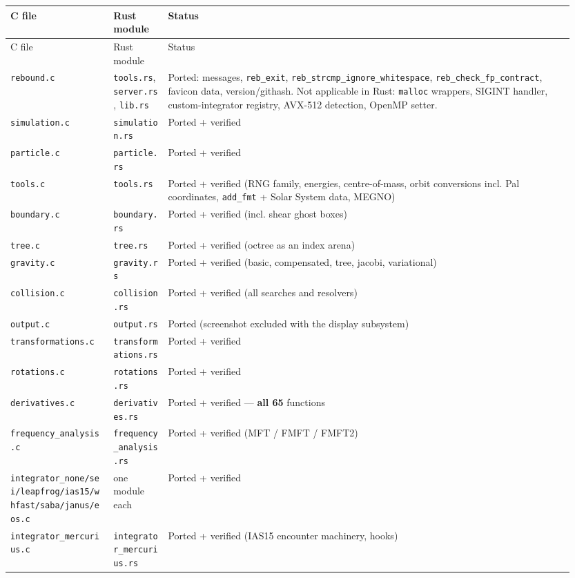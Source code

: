 \documentclass[11pt]{article}
\begin{document}
\begin{longtable}{L{0.171\linewidth}L{0.099\linewidth}L{0.679\linewidth}}
\toprule
C file & Rust module & Status \\
\midrule
\endfirsthead
\toprule
C file & Rust module & Status \\
\midrule
\endhead
\texttt{rebound.c} & \texttt{tools.rs}, \texttt{server.rs}, \texttt{lib.rs} & Ported: messages, \texttt{reb\_exit}, \texttt{reb\_strcmp\_ignore\_whitespace}, \texttt{reb\_check\_fp\_contract}, favicon data, version/githash. Not applicable in Rust: \texttt{malloc} wrappers, SIGINT handler, custom-integrator registry, AVX-512 detection, OpenMP setter. \\
\texttt{simulation.c} & \texttt{simulation.rs} & Ported + verified \\
\texttt{particle.c} & \texttt{particle.rs} & Ported + verified \\
\texttt{tools.c} & \texttt{tools.rs} & Ported + verified (RNG family, energies, centre-of-mass, orbit conversions incl. Pal coordinates, \texttt{add\_fmt} + Solar System data, MEGNO) \\
\texttt{boundary.c} & \texttt{boundary.rs} & Ported + verified (incl. shear ghost boxes) \\
\texttt{tree.c} & \texttt{tree.rs} & Ported + verified (octree as an index arena) \\
\texttt{gravity.c} & \texttt{gravity.rs} & Ported + verified (basic, compensated, tree, jacobi, variational) \\
\texttt{collision.c} & \texttt{collision.rs} & Ported + verified (all searches and resolvers) \\
\texttt{output.c} & \texttt{output.rs} & Ported (screenshot excluded with the display subsystem) \\
\texttt{transformations.c} & \texttt{transformations.rs} & Ported + verified \\
\texttt{rotations.c} & \texttt{rotations.rs} & Ported + verified \\
\texttt{derivatives.c} & \texttt{derivatives.rs} & Ported + verified --- \textbf{all 65} functions \\
\texttt{frequency\_analysis.c} & \texttt{frequency\_analysis.rs} & Ported + verified (MFT / FMFT / FMFT2) \\
\texttt{integrator\_none/sei/leapfrog/ias15/whfast/saba/janus/eos.c} & one module each & Ported + verified \\
\texttt{integrator\_mercurius.c} & \texttt{integrator\_mercurius.rs} & Ported + verified (IAS15 encounter machinery, hooks) \\

\end{longtable}
\end{document}
